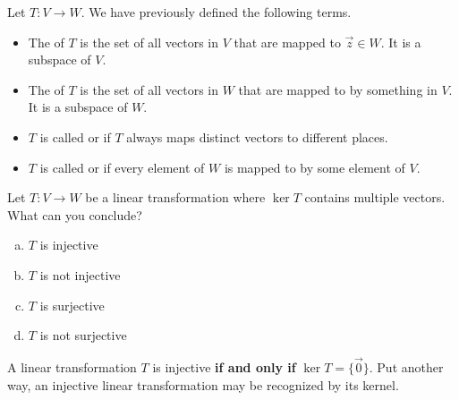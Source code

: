 \begin{observation}
Let \(T: V \rightarrow W\).  We have previously defined the following
terms.
\begin{itemize}
\item The  of \(T\) is the set of all vectors in \(V\) that are mapped to $\vec{z}\in W$.  It is a subspace of \(V\).
\item The  of \(T\) is the set of all vectors in \(W\) that are mapped to by something in \(V\).  It is a subspace of \(W\).
\item  \(T\) is called  or  if \(T\) always maps  distinct vectors to different places.
\item \(T\) is called  or  if every element of \(W\) is mapped to by some element of \(V\).
\end{itemize}
\end{observation}

\begin{activity}{5}
Let \(T: V \rightarrow W\) be a linear transformation where
\(\ker T\) contains multiple vectors. What can you conclude?
\begin{enumerate}[(a)]
\item \(T\) is injective
\item \(T\) is not injective
\item \(T\) is surjective
\item \(T\) is not surjective
\end{enumerate}
\end{activity}

\begin{fact}
A linear transformation $T$ is injective \textbf{if and only if} $\ker T = \{\vec{0}\}$. Put another way, an injective linear transformation may be
recognized by its  kernel.

\begin{center}
\end{center}
\end{fact}

